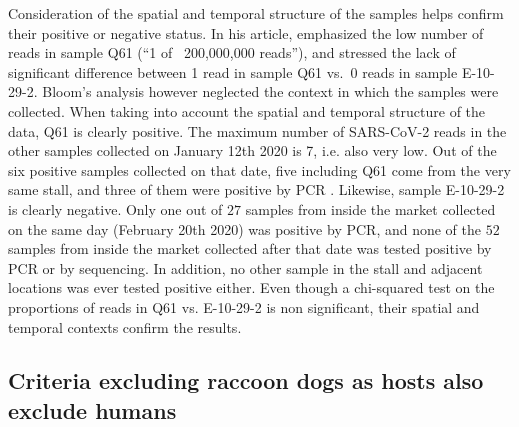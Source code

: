 \documentclass[11pt]{article}
\def \sct {\mbox{SARS-CoV-2}}
\begin{document}
Consideration of the spatial and temporal structure of the samples helps confirm their positive or negative status. In his article, \citet{Bloom2023VE} emphasized the low number of reads in sample Q61 (``1 of ~200,000,000 reads''), and stressed the lack of significant difference between 1 read in sample Q61 vs.\ 0 reads in sample E-10-29-2. Bloom's analysis however neglected the context in which the samples were collected. When taking into account the spatial and temporal structure of the data, Q61 is clearly positive. The maximum number of \sct{} reads in the other samples collected on January 12th 2020 is 7, i.e. also very low. Out of the six positive samples collected on that date, five including Q61 come from the very same stall, and three of them were positive by PCR \citep{ACC2023bioRxiv}. %
Likewise, sample E-10-29-2 is clearly negative. Only one out of $27$ samples from inside the market collected on the same day (February 20th 2020) was positive by PCR, and none of the $52$ samples from inside the market collected after that date was tested positive by PCR or by sequencing. In addition, no other sample in the stall and adjacent locations was ever tested positive either. Even though a chi-squared test on the proportions of reads in Q61 vs. E-10-29-2 is non significant, their spatial and temporal contexts confirm the results. 

\subsection{Criteria excluding raccoon dogs as hosts also exclude humans}
\end{document}

